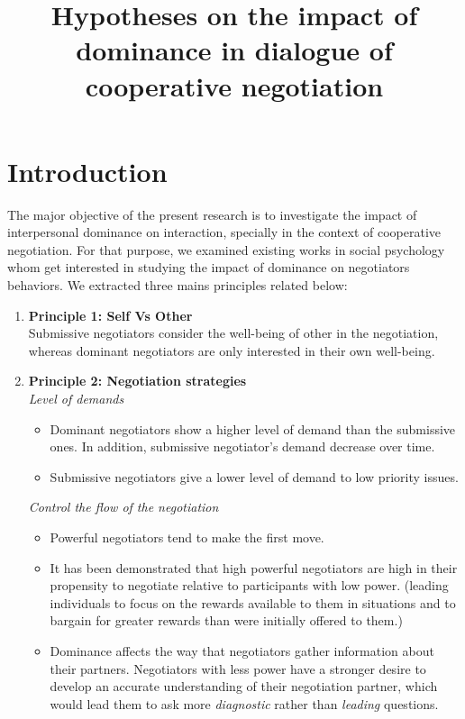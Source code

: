 \documentclass{article}
\begin{document}
		\title{\vskip -10pt Hypotheses on the impact of dominance in dialogue of cooperative negotiation}
		\maketitle
		
		
		\section{Introduction}
			The major objective of the present research is to investigate the impact of interpersonal dominance on interaction, specially in the context of cooperative negotiation. For that purpose, we examined existing works in social psychology whom get interested in studying the impact of dominance on negotiators behaviors. We extracted three mains principles related below:
			\begin{enumerate}
				\item \textbf{Principle 1: Self Vs Other}\\
				Submissive negotiators consider the well-being of other in the negotiation, whereas dominant negotiators are only interested in their own well-being.\cite{van2006power}
				
				\item \textbf{Principle 2: Negotiation strategies} \\
				\textit{Level of demands}
				\begin{itemize}
					\item Dominant negotiators show a higher level of demand than the submissive ones. In addition, submissive negotiator's demand decrease over time. \cite{de1995impact}
					\item Submissive negotiators give a lower level of demand to low priority issues. \cite{de1995impact}
				\end{itemize} 
				
				
				\textit{Control the flow of the negotiation}
				\begin{itemize}
					\item Powerful negotiators tend to make the first move. \cite{magee2007power}
					
					\item %
					It has been demonstrated that high powerful negotiators are high in their propensity to negotiate relative to participants with low power. (leading individuals to focus on the rewards available to them in situations and to bargain for greater rewards than were initially offered to them.)\cite{van2006power}
					
					\item Dominance affects the way that negotiators gather information about their partners. Negotiators with less power have a stronger desire to develop an accurate understanding of their negotiation partner, which would lead them to ask more \emph{diagnostic} rather than \emph{leading} questions.\cite{de2004influence}
					
				\end{itemize} 
		
			\end{enumerate}
\end{document}
